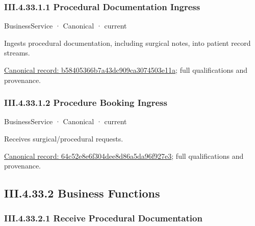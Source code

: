 \subsubsection*{III.4.33.1.1 Procedural Documentation Ingress}
\label{navigation:III.4.33.1.1}

\label{element:b58405366b7a43dc909ca3074503e11a}
{\small BusinessService · Canonical · current}\par

Ingests procedural documentation, including surgical notes, into patient record streams.


{\footnotesize \href{../../../../continuum/business/business-service/b58405366b7a43dc909ca3074503e11a.md}{Canonical record: b58405366b7a43dc909ca3074503e11a}; full qualifications and provenance.}\par
\subsubsection*{III.4.33.1.2 Procedure Booking Ingress}
\label{navigation:III.4.33.1.2}

\label{element:64c52e8e6f304dee8d86a5da96f927e3}
{\small BusinessService · Canonical · current}\par

Receives surgical/procedural requests.


{\footnotesize \href{../../../../continuum/business/business-service/64c52e8e6f304dee8d86a5da96f927e3.md}{Canonical record: 64c52e8e6f304dee8d86a5da96f927e3}; full qualifications and provenance.}\par
\subsection*{III.4.33.2 Business Functions}
\label{navigation:III.4.33.2}

\subsubsection*{III.4.33.2.1 Receive Procedural Documentation}
\label{navigation:III.4.33.2.1}

